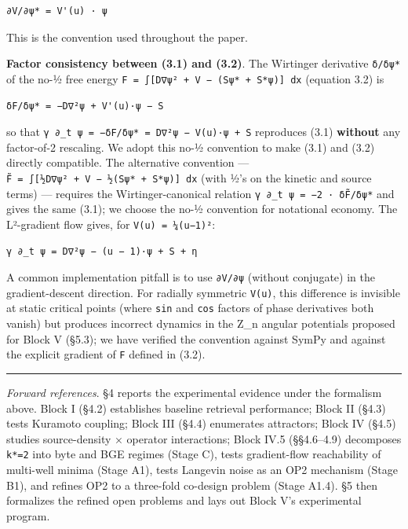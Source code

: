 \documentclass[
]{article}
\begin{document}
\begin{verbatim}
∂V/∂ψ* = V'(u) · ψ
\end{verbatim}

This is the convention used throughout the paper.

\textbf{Factor consistency between (3.1) and (3.2)}. The Wirtinger
derivative \texttt{δ/δψ*} of the no-½ free energy
\texttt{F\ =\ ∫{[}D\textbar{}∇ψ\textbar{}²\ +\ V\ −\ (Sψ*\ +\ S*ψ){]}\ dx}
(equation 3.2) is

\begin{verbatim}
δF/δψ* = −D∇²ψ + V'(u)·ψ − S
\end{verbatim}

so that
\texttt{γ\ ∂\_t\ ψ\ =\ −δF/δψ*\ =\ D∇²ψ\ −\ V\textquotesingle{}(u)·ψ\ +\ S}
reproduces (3.1) \textbf{without} any factor-of-2 rescaling. We adopt
this no-½ convention to make (3.1) and (3.2) directly compatible. The
alternative convention ---
\texttt{F̃\ =\ ∫{[}½D\textbar{}∇ψ\textbar{}²\ +\ V\ −\ ½(Sψ*\ +\ S*ψ){]}\ dx}
(with ½'s on the kinetic and source terms) --- requires the
Wirtinger-canonical relation \texttt{γ\ ∂\_t\ ψ\ =\ −2\ ·\ δF̃/δψ*} and
gives the same (3.1); we choose the no-½ convention for notational
economy. The L²-gradient flow gives, for \texttt{V(u)\ =\ ¼(u−1)²}:

\begin{verbatim}
γ ∂_t ψ = D∇²ψ − (u − 1)·ψ + S + η
\end{verbatim}

A common implementation pitfall is to use \texttt{∂V/∂ψ} (without
conjugate) in the gradient-descent direction. For radially symmetric
\texttt{V(u)}, this difference is invisible at static critical points
(where \texttt{sin} and \texttt{cos} factors of phase derivatives both
vanish) but produces incorrect dynamics in the Z\_n angular potentials
proposed for Block V (§5.3); we have verified the convention against
SymPy and against the explicit gradient of \texttt{F} defined in (3.2).

\begin{center}\rule{0.5\linewidth}{0.5pt}\end{center}

\emph{Forward references}. §4 reports the experimental evidence under
the formalism above. Block I (§4.2) establishes baseline retrieval
performance; Block II (§4.3) tests Kuramoto coupling; Block III (§4.4)
enumerates attractors; Block IV (§4.5) studies source-density × operator
interactions; Block IV.5 (§§4.6--4.9) decomposes \texttt{k*=2} into byte
and BGE regimes (Stage C), tests gradient-flow reachability of
multi-well minima (Stage A1), tests Langevin noise as an OP2 mechanism
(Stage B1), and refines OP2 to a three-fold co-design problem (Stage
A1.4). §5 then formalizes the refined open problems and lays out Block
V's experimental program.
\end{document}
